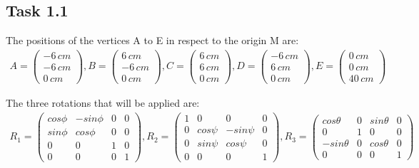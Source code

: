 \subsection*{Task 1.1}

The positions of the vertices A to E in respect to the origin M are:
\begin{align*}
A = 
\begin{pmatrix}
- 6\,cm \\
- 6\,cm \\
0\,cm
\end{pmatrix}, 
B =
\begin{pmatrix}
  6\,cm \\
- 6\,cm \\
0\,cm
\end{pmatrix},
C =
\begin{pmatrix}
6\,cm \\
6\,cm \\
0\,cm
\end{pmatrix},
D =
\begin{pmatrix}
- 6\,cm \\
6\,cm \\
0\,cm
\end{pmatrix},
E =
\begin{pmatrix}
0\,cm \\
0\,cm \\
40\,cm
\end{pmatrix}
\end{align*}

The three rotations that will be applied are:
\begin{align*}
R_1 = 
\begin{pmatrix}
cos\phi & -sin\phi & 0 & 0 \\
sin\phi & cos\phi & 0 & 0 \\
0 & 0 & 1 & 0 \\
0 & 0 & 0 & 1 
\end{pmatrix}, 
R_2 = 
\begin{pmatrix}
1 & 0 & 0 & 0 \\
0 & cos\psi & -sin\psi & 0 \\
0 & sin\psi & cos\psi & 0 \\
0 & 0 & 0 & 1 
\end{pmatrix}, 
R_3 = 
\begin{pmatrix}
cos\theta & 0 & sin\theta & 0 \\
0 & 1 & 0 & 0 \\
-sin\theta & 0 & cos\theta & 0 \\
0 & 0 & 0 & 1 
\end{pmatrix}
\end{align*}

